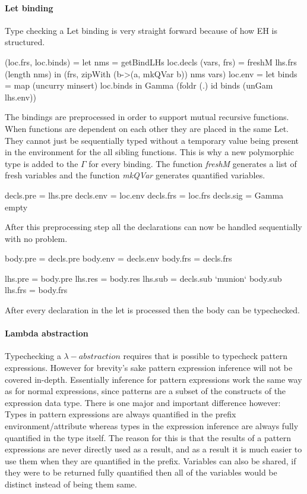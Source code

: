 \paragraph{Let binding}
Type checking a Let binding is very straight forward because of how EH is structured.

\begin{code}
(loc.frs, loc.binds)  =  let  nms          = getBindLHs loc.decls
                              (vars, frs)  = freshM lhs.frs (length nms)
                         in (frs, zipWith (\a b->(a, mkQVar b)) nms vars)
loc.env   =  let binds = map (uncurry minsert) loc.binds 
             in Gamma (foldr (.) id binds (unGam lhs.env))
\end{code}
The bindings are preprocessed in order to support mutual recursive functions. When functions are dependent on each other they are placed in the same Let. They cannot just be sequentially typed without a temporary value being present in the environment for the all sibling functions. This is why a new polymorphic type is added to the $\Gamma$ for every binding. The function \emph{freshM} generates a list of fresh variables and the function \emph{mkQVar} generates quantified variables.

\begin{code}
decls.pre  = lhs.pre
decls.env  = loc.env
decls.frs  = loc.frs
decls.sig  = Gamma empty
\end{code}
After this preprocessing step all the declarations can now be handled sequentially with no problem.

\begin{code}
body.pre  = decls.pre
body.env  = decls.env 
body.frs  = decls.frs

lhs.pre   = body.pre
lhs.res   = body.res
lhs.sub   = decls.sub `munion` body.sub
lhs.frs   = body.frs
\end{code}
After every declaration in the let is processed then the body can be typechecked.

\paragraph{Lambda abstraction}
Typechecking a $\lambda-abstraction$ requires that is possible to typecheck pattern expressions. However for brevity's sake pattern expression inference will not be covered in-depth. Essentially inference for pattern expressions work the same way as for normal expressions, since patterns are a subset of the constructs of the expression data type. There is one major and important difference however: Types in pattern expressions are always quantified in the prefix environment/attribute whereas types in the expression inference are always fully quantified in the type itself. The reason for this is that the results of a pattern expressions are never directly used as a result, and as a result it is much easier to use them when they are quantified in the prefix. Variables can also be shared, if they were to be returned fully quantified then all of the variables would be distinct instead of being them same.

